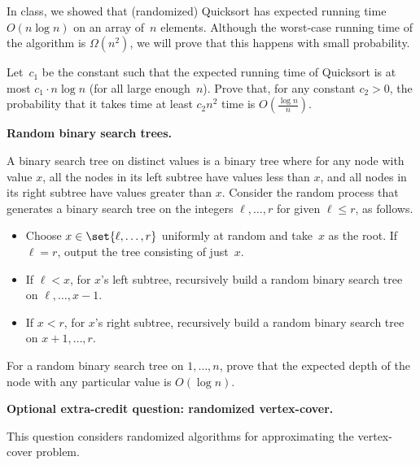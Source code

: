 \documentclass[11pt,addpoints,answers]{exam}
\begin{document}
\begin{questions}
  In class, we showed that (randomized) Quicksort has expected running time $O(n \log n)$ on an array of~$n$ elements.
  Although the worst-case running time of the algorithm is $\Omega(n^2)$, we will prove that this happens with small probability.
    
  Let~$c_1$ be the constant such that the expected running time of Quicksort is at most $c_1 \cdot n\log n$ (for all large enough~$n$).
  Prove that, for any constant $c_2 >0$, the probability that it takes time at least $c_2 n^2$ time is $O(\frac{\log n}{n})$.
      
  \begin{solution}
    
  \end{solution}

  \question[12] \textbf{Random binary search trees.}

  A binary search tree on distinct values is a binary tree where for any node with value $x$, all the nodes in its left subtree have values less than $x$, and all nodes in its right subtree have values greater than $x$.
  Consider the random process that generates a binary search tree on the integers $\ell,\ldots,r$ for given $\ell \leq r$, as follows.
  \begin{itemize}
  \item Choose $x \in \set{\ell,\dots,r}$ uniformly at random and take~$x$ as the root.
    If $\ell=r$, output the tree consisting of just~$x$.
  \item If $\ell < x$, for $x$'s left subtree, recursively build a random binary search tree on $\ell,\ldots,x-1$.
  \item If $x < r$, for $x$'s right subtree, recursively build a random binary search tree on $x+1,\ldots,r$.
  \end{itemize}

  For a random binary search tree on $1, \ldots, n$, prove that the expected depth of the node with any particular value is $O(\log n)$.
  
    
  \begin{solution}
    
  \end{solution}

  \pagebreak
  
  \bonusquestion[5] \textbf{Optional extra-credit question: randomized vertex-cover.}

  This question considers randomized algorithms for approximating the vertex-cover problem.
    

\end{questions}
\end{document}
